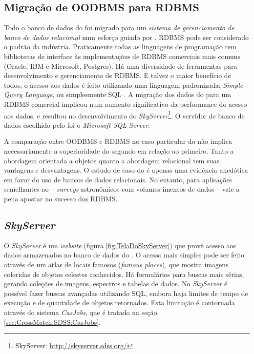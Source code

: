 \subsection{Migração de OODBMS para RDBMS}
\label{sec:CrossMatch:SDSS:MigracaoRDBMS}

Todo o banco de dados do \SDSS foi migrado para um {\em sistema de gerenciamento
de banco de dados relacional} \citep[RDBMS;][]{Codd1970} num esforço guiado por
\citeauthor{Thakar2004}. RDBMS pode ser considerado o padrão da indústria.
Praticamente todas as linguagens de programação tem bibliotecas de interface às
implementações de RDBMS comerciais mais comuns (Oracle, IBM e Microsoft,
Postgres). Há uma diversidade de ferramentas para desenvolvimento e
gerenciamento de RDBMS. E talvez o maior benefício de todos, o acesso aos dados
é feito utilizando uma linguagem padronizada: {\em Simple Query Language}, ou
simplesmente SQL \citep{Chamberlin1974}. A migração dos dados do \SDSS para um
RDBMS comercial implicou num aumento significativo da performance do acesso aos
dados, e resultou no desenvolvimento do {\em SkyServer}\footnote{\SDSS
SkyServer: \url{http://skyserver.sdss.org/}}. O servidor de banco de dados
escolhido pelo \SDSS foi o {\em Microsoft SQL Server}.

A comparação entre OODBMS e RDBMS no caso particular do \SDSS não implica
necessariamente a superioridade do segundo em relação ao primeiro. Tanto a
abordagem orientada a objetos quanto a abordagem relacional tem suas vantagens e
desvantagens. O estudo de caso do \SDSS é apenas uma evidência anedótica em
favor do uso de bancos de dados relacionais. No entanto, para aplicações
semelhantes ao \SDSS -- {\em surveys} astronômicos com volumes imensos de dados
-- vale a pena apostar no sucesso dos RDBMS.

\subsection{{\em SkyServer}}
\label{sec:CrossMatch:SDSS:SkyServer}

O {\em SkyServer} é um {\em website} (figura \ref{fig:TelaDoSkyServer}) que
provê acesso aos dados armazenados no banco de dados do \SDSS
\citep{Szalay2002}. O acesso mais simples pode ser feito através de um atlas de
locais famosos ({\em famous places}), que mostra imagens coloridas de objetos
celestes conhecidos. Há formulários para buscas mais sérias, gerando coleções de
imagens, espectros e tabelas de dados. No {\em SkyServer} é possível fazer
buscas avançadas utilizando SQL, embora haja limites de tempo de execução e de
quantidade de objetos retornados. Esta limitação é contornada através do sistema
{\em CasJobs}, que é tratado na seção \ref{sec:CrossMatch:SDSS:CasJobs}.

